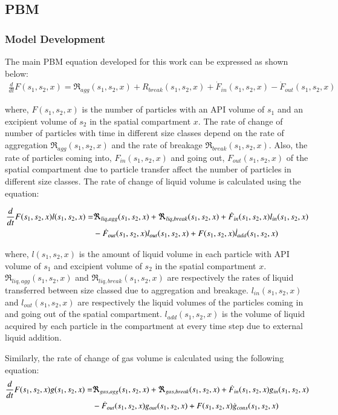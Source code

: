 \documentclass[preprint,11pt,authoryear]{elsarticle}
\begin{document}
	    
	  \subsection{PBM}
	    \subsubsection{Model Development}
	    \par The main PBM equation developed for this work can be expressed as shown below:
	    \begin{align}
	    \frac{d}{dt}F(s_1,s_2,x)=\Re_{agg}(s_1,s_2,x)+R_{break}(s_1,s_2,x)+\dot{F}_{in}(s_1,s_2,x)-\dot{F}_{out}(s_1,s_2,x)
	    \label{eqn:mthds_pbm_overall} 
	    \end{align}
	    
	    \par where, $F(s_1,s_2,x)$ is the number of particles with an API volume of $s_1$ and an excipient volume of $s_2$ in the spatial compartment $x$. The rate of change of number of particles with time in different size classes depend on the rate of aggregation $\Re_{agg}(s_1,s_2,x)$ and the rate of breakage $\Re_{break}(s_1,s_2,x)$. Also, the rate of particles coming into, $F_{in}(s_1,s_2,x)$ and going out, $F_{out}(s_1,s_2,x)$ of the spatial compartment due to particle transfer affect the number of particles in different size classes. 
	The rate of change of liquid volume is calculated using the equation: 
	
	    \begin{align}
	    \frac{d}{dt}F(s_1,s_2,x)l(s_1,s_2,x)=& \Re_{liq,agg}(s_1,s_2,x)+\Re_{liq,break}(s_1,s_2,x)+\dot{F}_{in}(s_1,s_2,x)l_{in}(s_1,s_2,x)\notag\\
	    &-\dot{F}_{out}(s_1,s_2,x)l_{out}(s_1,s_2,x)+F(s_1,s_2,x)\dot{l}_{add}(s_1,s_2,x)
	    \end{align}
	    
	    \par where, $l(s_1,s_2,x)$ is the amount of liquid volume in each particle with API volume of $s_1$ and excipient volume of $s_2$ in the spatial compartment $x$. $\Re_{liq,agg}(s_1,s_2,x)$ and $\Re_{liq,break}(s_1,s_2,x)$ are respectively the rates of liquid transferred between size classed due to aggregation and breakage. $l_{in}(s_1,s_2,x)$ and $l_{out}(s_1,s_2,x)$ are respectively the liquid volumes of the particles coming in and going out of the spatial compartment. $l_{add}(s_1,s_2,x)$ is the volume of liquid acquired by each particle in the compartment at every time step due to external liquid addition. 
	    \par Similarly, the rate of change of gas volume is calculated using the following equation: 
	    \begin{align}
	    \frac{d}{dt}F(s_1,s_2,x)g(s_1,s_2,x)=& \Re_{gas,agg}(s_1,s_2,x)+\Re_{gas,break}(s_1,s_2,x)+\dot{F}_{in}(s_1,s_2,x)g_{in}(s_1,s_2,x)\notag\\
	    &-\dot{F}_{out}(s_1,s_2,x)g_{out}(s_1,s_2,x)+F(s_1,s_2,x)\dot{g}_{cons}(s_1,s_2,x)
	    \end{align}
	    
\end{document}
